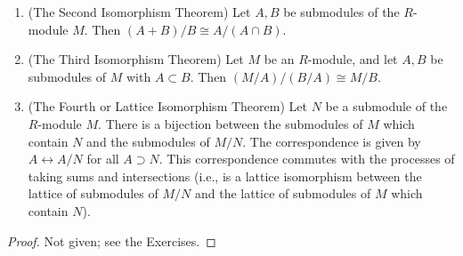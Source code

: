 \documentclass[../notes.tex]{subfiles}
\begin{document}
\begin{itemize}
\begin{theorem}
\begin{enumerate}[ref={\thetheorem(\arabic*)}]
            \item \label{trm:10.4b}(The Second Isomorphism Theorem) Let $A,B$ be submodules of the $R$-module $M$. Then $(A+B)/B\cong A/(A\cap B)$.
            \item \label{trm:10.4c}(The Third Isomorphism Theorem) Let $M$ be an $R$-module, and let $A,B$ be submodules of $M$ with $A\subset B$. Then $(M/A)/(B/A)\cong M/B$.
            \item \label{trm:10.4d}(The Fourth or Lattice Isomorphism Theorem) Let $N$ be a submodule of the $R$-module $M$. There is a bijection between the submodules of $M$ which contain $N$ and the submodules of $M/N$. The correspondence is given by $A\longleftrightarrow A/N$ for all $A\supset N$. This correspondence commutes with the processes of taking sums and intersections (i.e., is a lattice isomorphism between the lattice of submodules of $M/N$ and the lattice of submodules of $M$ which contain $N$).
        \end{enumerate}
        \begin{proof}
            Not given; see the Exercises.
        \end{proof}
    \end{theorem}
\end{itemize}
\end{document}
